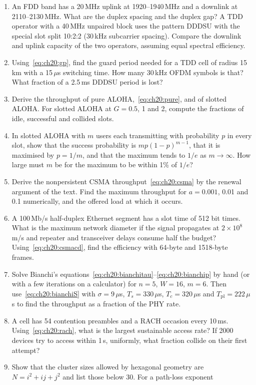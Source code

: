\problems
\begin{enumerate}[label=\thechapter.\arabic*]
\item An FDD band has a 20\,MHz uplink at 1920--1940\,MHz and a downlink at 2110--2130\,MHz. What are the duplex spacing and the
duplex gap? A TDD operator with a 40\,MHz unpaired block uses the pattern DDDSU with the special slot split 10:2:2 (30\,kHz
subcarrier spacing). Compare the downlink and uplink capacity of the two operators, assuming equal spectral efficiency.
\item Using~\eqref{eq:ch20:gp}, find the guard period needed for a TDD cell of radius 15\,km with a 15\,$\mu$s switching time.
How many 30\,kHz OFDM symbols is that? What fraction of a 2.5\,ms DDDSU period is lost?
\item Derive the throughput of pure ALOHA,~\eqref{eq:ch20:pure}, and of slotted ALOHA. For slotted ALOHA at $G=0.5$, 1 and 2,
compute the fractions of idle, successful and collided slots.
\item In slotted ALOHA with $m$ users each transmitting with probability $p$ in every slot, show that the success probability is
$mp(1-p)^{m-1}$, that it is maximised by $p=1/m$, and that the maximum tends to $1/e$ as $m\to\infty$. How large must $m$ be for
the maximum to be within 1\% of $1/e$?
\item Derive the nonpersistent CSMA throughput~\eqref{eq:ch20:csma} by the renewal argument of the text. Find the maximum
throughput for $a=0.001$, 0.01 and 0.1 numerically, and the offered load at which it occurs.
\item A 100\,Mb/s half-duplex Ethernet segment has a slot time of 512 bit times. What is the maximum network diameter if the
signal propagates at $2\times10^8$\,m/s and repeater and transceiver delays consume half the budget? Using~\eqref{eq:ch20:csmacd},
find the efficiency with 64-byte and 1518-byte frames.
\item Solve Bianchi's equations~\eqref{eq:ch20:bianchitau}--\eqref{eq:ch20:bianchip} by hand (or with a few iterations on a
calculator) for $n=5$, $W=16$, $m=6$. Then use~\eqref{eq:ch20:bianchiS} with $\sigma=9\,\mu$s, $T_s=330\,\mu$s,
$T_c=320\,\mu$s and $T_{\text{pl}}=222\,\mu$s to find the throughput as a fraction of the PHY rate.
\item A cell has 54 contention preambles and a RACH occasion every 10\,ms. Using~\eqref{eq:ch20:rach}, what is the largest
sustainable access rate? If 2000 devices try to access within 1\,s, uniformly, what fraction collide on their first attempt?
\item Show that the cluster sizes allowed by hexagonal geometry are $N=i^2+ij+j^2$ and list those below 30. For a path-loss exponent

\end{enumerate}
